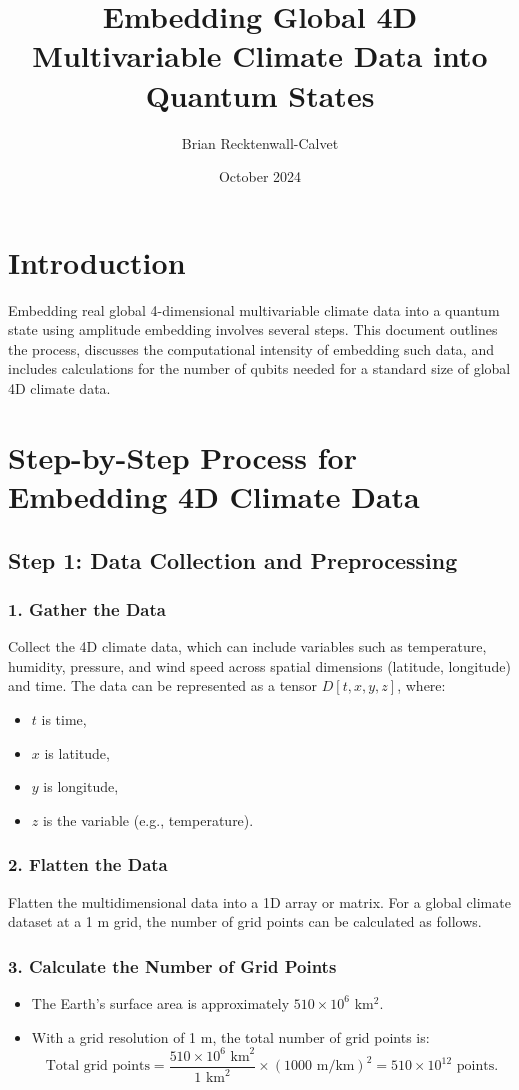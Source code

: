 \documentclass{article}
\title{Embedding Global 4D Multivariable Climate Data into Quantum States}
\author{Brian Recktenwall-Calvet}
\date{October 2024}
\begin{document}
\maketitle

\section{Introduction}
Embedding real global 4-dimensional multivariable climate data into a quantum state using amplitude embedding involves several steps. This document outlines the process, discusses the computational intensity of embedding such data, and includes calculations for the number of qubits needed for a standard size of global 4D climate data.

\section{Step-by-Step Process for Embedding 4D Climate Data}

\subsection{Step 1: Data Collection and Preprocessing}

\subsubsection{1. Gather the Data}
Collect the 4D climate data, which can include variables such as temperature, humidity, pressure, and wind speed across spatial dimensions (latitude, longitude) and time. The data can be represented as a tensor \( D[t, x, y, z] \), where:
\begin{itemize}
    \item \( t \) is time,
    \item \( x \) is latitude,
    \item \( y \) is longitude,
    \item \( z \) is the variable (e.g., temperature).
\end{itemize}

\subsubsection{2. Flatten the Data}
Flatten the multidimensional data into a 1D array or matrix. For a global climate dataset at a 1 m grid, the number of grid points can be calculated as follows.

\subsubsection{3. Calculate the Number of Grid Points}
\begin{itemize}
    \item The Earth's surface area is approximately \( 510 \times 10^6 \) km\(^2\).
    \item With a grid resolution of 1 m, the total number of grid points is:
    \[
    \text{Total grid points} = \frac{510 \times 10^6 \text{ km}^2}{1 \text{ km}^2} \times (1000 \text{ m/km})^2 = 510 \times 10^{12} \text{ points}.
    \]
\end{itemize}
\end{document}
